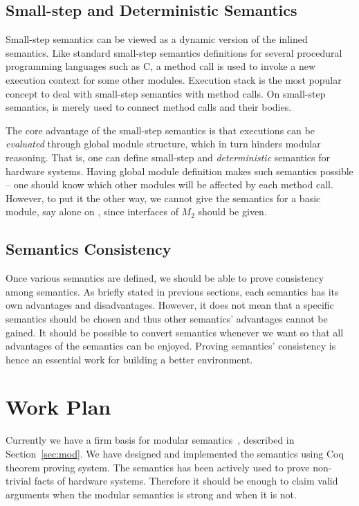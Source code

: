 \subsection{Small-step and Deterministic Semantics}

Small-step semantics can be viewed as a dynamic version of the inlined
semantics. Like standard small-step semantics definitions for several
procedural programming languages such as C, a method call is used to
invoke a new execution context for some other modules.  Execution
stack is the most popular concept to deal with small-step semantics
with method calls. On small-step semantics, \ModP{} is merely used to
connect method calls and their bodies.

The core advantage of the small-step semantics is that executions can
be \emph{evaluated} through global module structure, which in turn
hinders modular reasoning. That is, one can define small-step and
\emph{deterministic} semantics for hardware systems. Having global
module definition makes such semantics possible -- one should know
which other modules will be affected by each method call. However, to
put it the other way, we cannot give the semantics for a basic module,
say  alone on , since interfaces of
$M_2$ should be given.

\subsection{Semantics Consistency}

Once various semantics are defined, we should be able to prove
consistency among semantics. As briefly stated in previous sections,
each semantics has its own advantages and disadvantages. However, it
does not mean that a specific semantics should be chosen and thus
other semantics' advantages cannot be gained. It should be possible to
convert semantics whenever we want so that all advantages of the
semantics can be enjoyed. Proving semantics' consistency is hence an
essential work for building a better environment.

\section{Work Plan}

Currently we have a firm basis for modular semantics~\cite{CAV},
described in Section~\ref{sec:mod}. We have designed and implemented
the semantics using Coq theorem proving system. The semantics has been
actively used to prove non-trivial facts of hardware
systems. Therefore it should be enough to claim valid arguments when
the modular semantics is strong and when it is not.

